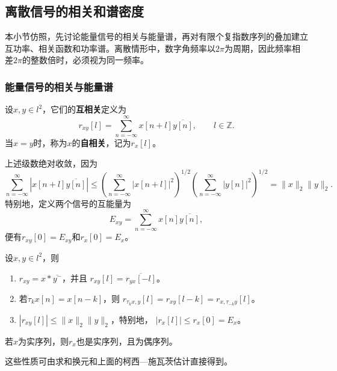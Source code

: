 \subsection{离散信号的相关和谱密度}\label{sub:discrete_corr}

本小节仿照，先讨论能量信号的相关与能量谱，再对有限个复指数序列的叠加建立互功率、相关函数和功率谱。离散情形中，数字角频率以$2\pi$为周期，因此频率相差$2\pi$的整数倍时，必须视为同一频率。

\subsubsection{能量信号的相关与能量谱}

\begin{definition}[离散能量信号的相关]\label{def:discrete_correlation_energy}
    设$x,y\in l^2$，它们的\textbf{互相关}定义为
    $$
        r_{xy}[l]=\sum_{n=-\infty}^{\infty}
        x[n+l]\overline{y[n]},\qquad l\in\mathbb{Z}.
    $$
    当$x=y$时，称为$x$的\textbf{自相关}，记为$r_x[l]$。
\end{definition}

上述级数绝对收敛，因为
$$
    \sum_{n=-\infty}^{\infty}|x[n+l]\overline{y[n]}|
    \le\left(\sum_{n=-\infty}^{\infty}|x[n+l]|^2\right)^{1/2}
    \left(\sum_{n=-\infty}^{\infty}|y[n]|^2\right)^{1/2}
    =\|x\|_2\|y\|_2.
$$
特别地，定义两个信号的互能量为
$$
    E_{xy}=\sum_{n=-\infty}^{\infty}x[n]\overline{y[n]},
$$
便有$r_{xy}[0]=E_{xy}$和$r_x[0]=E_x$。

\begin{proposition}[离散能量信号的相关的性质]
    设$x,y\in l^2$，则
    \begin{enumerate}
        \item $r_{xy}=x*\overline{y^-}$，并且
              $r_{xy}[l]=\overline{r_{yx}[-l]}$。
        \item 若$\tau_k x[n]=x[n-k]$，则
              $r_{\tau_k x,y}[l]=r_{xy}[l-k]=r_{x,\tau_{-k}y}[l]$。
        \item $|r_{xy}[l]|\le\|x\|_2\|y\|_2$，特别地，
              $|r_x[l]|\le r_x[0]=E_x$。
    \end{enumerate}
    若$x$为实序列，则$r_x$也是实序列，且为偶序列。
\end{proposition}
这些性质可由求和换元和上面的柯西—施瓦茨估计直接得到。

